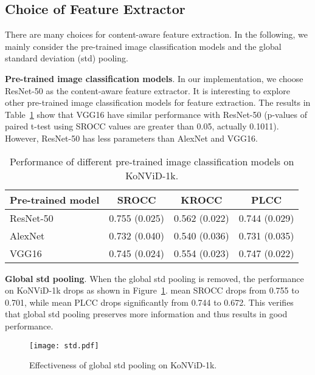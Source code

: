 \documentclass[sigconf]{acmart}
\begin{document}
\subsection{Choice of Feature Extractor}
There are many choices for content-aware feature extraction. In the following, we mainly consider the pre-trained image classification models and the global standard deviation (std) pooling.

\textbf{Pre-trained image classification models}. In our implementation, we choose ResNet-50 as the content-aware feature extractor. It is interesting to explore other pre-trained image classification models for feature extraction. The results in Table~\ref{tab:cnn} show that VGG16 have similar performance with ResNet-50 (p-values of paired t-test using SROCC values are greater than 0.05, actually 0.1011). However, ResNet-50 has less parameters than AlexNet and VGG16.

\begin{table}[!hbt]
    \centering
    \caption{Performance of different pre-trained image classification models on KoNViD-1k.}
    \label{tab:cnn}
    \begin{small}
    \begin{tabular}{lccc}
    \toprule
    Pre-trained model & SROCC & KROCC & PLCC \\
    \midrule
    ResNet-50 & 0.755 (0.025) & 0.562 (0.022) & 0.744 (0.029) \\
    AlexNet & 0.732 (0.040) & 0.540 (0.036) & 0.731 (0.035) \\
    VGG16 & 0.745 (0.024) & 0.554 (0.023) & 0.747 (0.022) \\
    \bottomrule
    \end{tabular}
    \end{small}
\end{table}

\textbf{Global std pooling}. When the global std pooling is removed, the performance on KoNViD-1k drops as shown in Figure~\ref{fig:std}. mean SROCC drops from 0.755 to 0.701, while mean PLCC drops significantly from 0.744 to 0.672. This verifies that global std pooling preserves more information and thus results in good performance.

\begin{figure}[!htb]
\begin{center}
  \texttt{[image: std.pdf]}
\end{center}
   \caption{Effectiveness of global std pooling on KoNViD-1k.}
\label{fig:std}
\end{figure}
\end{document}
